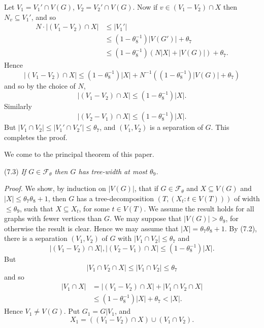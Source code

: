 Let $V_1 = V_1' \cap V(G)$, $V_2 = V_2' \cap V(G)$. Now if $v \in (V_1 - V_2) \cap X$ then $N_v \subseteq V_1'$, and so
\begin{align*}
N \cdot |(V_1 - V_2) \cap X| &\le |V_1'| \\
&\le (1 - \theta_8^{-1}) |V(G')| + \theta_7 \\
&\le (1 - \theta_8^{-1})(N|X| + |V(G)|) + \theta_7.
\end{align*}
Hence
\begin{equation*}
|(V_1 - V_2) \cap X| \le (1 - \theta_8^{-1})|X| + N^{-1}((1 - \theta_8^{-1})|V(G)| + \theta_7)
\end{equation*}
and so by the choice of $N$,
\begin{equation*}
|(V_1 - V_2) \cap X| \le (1 - \theta_8^{-1})|X|.
\end{equation*}
Similarly
\begin{equation*}
|(V_2 - V_1) \cap X| \le (1 - \theta_8^{-1})|X|.
\end{equation*}
But $|V_1 \cap V_2| \le |V_1' \cap V_2'| \le \theta_7$, and $(V_1, V_2)$ is a separation of $G$. This completes the proof.

We come to the principal theorem of this paper.

\stmt
(7.3) \textit{If $G \in \mathcal{F}_\theta$ then $G$ has tree-width at most $\theta_9$.}

\textit{Proof.} We show, by induction on $|V(G)|$, that if $G \in \mathcal{F}_\theta$ and $X \subseteq V(G)$ and $|X| \le \theta_7 \theta_8 + 1$, then $G$ has a tree-decomposition $(T, (X_t : t \in V(T)))$ of width $\le \theta_9$, such that $X \subseteq X_t$, for some $t \in V(T)$. We assume the result holds for all graphs with fewer vertices than $G$. We may suppose that $|V(G)| > \theta_9$, for otherwise the result is clear. Hence we may assume that $|X| = \theta_7 \theta_8 + 1$. By (7.2), there is a separation $(V_1, V_2)$ of $G$ with $|V_1 \cap V_2| \le \theta_7$ and
\begin{equation*}
|(V_1 - V_2) \cap X|, |(V_2 - V_1) \cap X| \le (1 - \theta_8^{-1})|X|.
\end{equation*}
But
\begin{equation*}
|V_1 \cap V_2 \cap X| \le |V_1 \cap V_2| \le \theta_7
\end{equation*}
and so
\begin{align*}
|V_1 \cap X| &= |(V_1 - V_2) \cap X| + |V_1 \cap V_2 \cap X| \\
&\le (1 - \theta_8^{-1})|X| + \theta_7 < |X|.
\end{align*}
Hence $V_1 \ne V(G)$. Put $G_1 = G | V_1$, and
\begin{equation*}
X_1 = ((V_1 - V_2) \cap X) \cup (V_1 \cap V_2).
\end{equation*}
